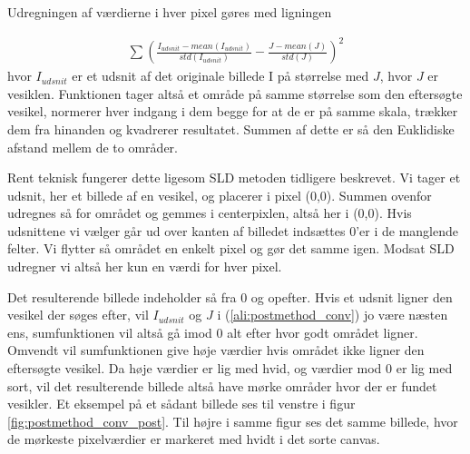 Udregningen af værdierne i hver pixel gøres med ligningen

\begin{align}
	\sum \left(\frac{I_{udsnit}-mean(I_{udsnit})}{std(I_{udsnit})}-\frac{J-mean(J)}{std(J)}\right)^2 \label{ali:postmethod_conv}
\end{align}
hvor $I_{udsnit}$ er et udsnit af det originale billede I på størrelse med $J$, hvor $J$ er vesiklen. Funktionen tager altså et område på samme størrelse som den eftersøgte vesikel, normerer hver indgang i dem begge for at de er på samme skala, trækker dem fra hinanden og kvadrerer resultatet. Summen af dette er så den Euklidiske afstand mellem de to områder.

Rent teknisk fungerer dette ligesom SLD metoden tidligere beskrevet. Vi tager et udsnit, her et billede af en vesikel, og placerer i pixel (0,0). Summen ovenfor udregnes så for området og gemmes i centerpixlen, altså her i (0,0). Hvis udsnittene vi vælger går ud over kanten af billedet indsættes 0'er i de manglende felter. Vi flytter så området en enkelt pixel og gør det samme igen. Modsat SLD udregner vi altså her kun en værdi for hver pixel. 

Det resulterende billede indeholder så fra 0 og opefter. Hvis et udsnit ligner den vesikel der søges efter, vil $I_{udsnit}$ og $J$ i (\ref{ali:postmethod_conv}) jo være næsten ens, sumfunktionen vil altså gå imod 0 alt efter hvor godt området ligner. Omvendt vil sumfunktionen give høje værdier hvis området ikke ligner den eftersøgte vesikel. Da høje værdier er lig med hvid, og værdier mod 0 er lig med sort, vil det resulterende billede altså have mørke områder hvor der er fundet vesikler. Et eksempel på et sådant billede ses til venstre i figur \ref{fig:postmethod_conv_post}. Til højre i samme figur ses det samme billede, hvor de mørkeste pixelværdier er markeret med hvidt i det sorte canvas.

